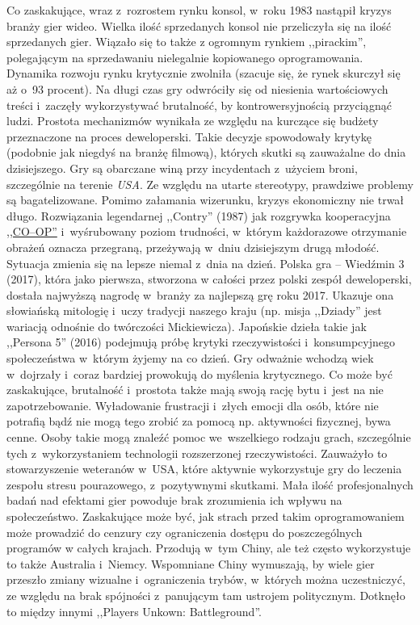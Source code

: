 \documentclass[brudnopis]{xmgr}
\begin{document}
Co zaskakujące, wraz z~rozrostem rynku konsol, w~roku 1983 nastąpił kryzys branży gier wideo. Wielka ilość sprzedanych konsol nie przeliczyła się na ilość sprzedanych gier. Wiązało się to także z ogromnym rynkiem ,,pirackim'', polegającym na sprzedawaniu nielegalnie kopiowanego oprogramowania. Dynamika rozwoju rynku krytycznie zwolniła (szacuje się, że rynek skurczył się aż o~93 procent).
Na długi czas gry odwróciły się od niesienia wartościowych treści i~zaczęły wykorzystywać brutalność, by kontrowersyjnością przyciągnąć ludzi. Prostota mechanizmów wynikała ze względu na kurczące się budżety
przeznaczone na proces deweloperski. Takie decyzje spowodowały krytykę (podobnie jak niegdyś na branżę filmową), których skutki są zauważalne do dnia dzisiejszego. Gry są obarczane winą przy incydentach z~użyciem broni, szczególnie na terenie {\em USA}. Ze względu na utarte stereotypy, prawdziwe problemy są bagatelizowane.
Pomimo załamania wizerunku, kryzys ekonomiczny nie trwał długo. Rozwiązania legendarnej ,,Contry'' (1987) jak rozgrywka
kooperacyjna \hyperref[slownik]{,,CO--OP''}  i~wyśrubowany poziom trudności, w~którym każdorazowe
otrzymanie obrażeń oznacza przegraną, przeżywają w~dniu dzisiejszym drugą
młodość. Sytuacja zmienia się na lepsze niemal z~dnia na dzień. Polska gra --
Wiedźmin 3 (2017), która jako pierwsza, stworzona w całości przez polski zespół
deweloperski, dostała najwyższą nagrodę w~branży za najlepszą grę roku
2017. Ukazuje ona słowiańską mitologię i~uczy tradycji naszego
kraju (np. misja ,,Dziady'' jest wariacją odnośnie do twórczości Mickiewicza).
Japońskie dzieła takie jak ,,Persona 5'' (2016) podejmują próbę krytyki
rzeczywistości i~konsumpcyjnego społeczeństwa w~którym żyjemy na co dzień. Gry odważnie
wchodzą wiek w~dojrzały i~coraz bardziej prowokują do myślenia
krytycznego.
Co może być zaskakujące, brutalność i~prostota 
także mają swoją rację bytu i~jest na nie zapotrzebowanie. Wyładowanie
frustracji i~złych emocji dla osób, które nie potrafią bądź nie mogą tego
zrobić za pomocą np. aktywności fizycznej, bywa cenne. Osoby takie mogą znaleźć pomoc we~wszelkiego rodzaju grach, szczególnie tych z~wykorzystaniem technologii rozszerzonej rzeczywistości. Zauważyło to stowarzyszenie weteranów w~USA, które aktywnie
wykorzystuje gry do leczenia zespołu stresu pourazowego, z~pozytywnymi skutkami.
Mała ilość profesjonalnych badań nad efektami gier powoduje brak zrozumienia ich wpływu na społeczeństwo. Zaskakujące może być, jak strach przed takim oprogramowaniem może prowadzić do cenzury czy ograniczenia dostępu do poszczególnych programów w całych krajach. Przodują w~tym Chiny, ale też często wykorzystuje to także Australia i~Niemcy. Wspomniane Chiny wymuszają, by wiele gier przeszło zmiany
wizualne i~ograniczenia trybów, w~których można uczestniczyć, ze względu na brak spójności z~panującym tam ustrojem politycznym. Dotknęło to między innymi ,,Players Unkown: Battleground''.
\end{document}
